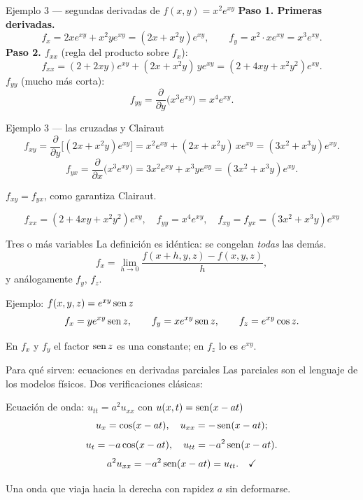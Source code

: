 \documentclass[11pt,aspectratio=169]{beamer}
\begin{document}
\begin{frame}{Ejemplo 3 --- segundas derivadas de $f(x,y)=x^2e^{xy}$}
  \textbf{Paso 1. Primeras derivadas.}
  \[
    f_x = 2xe^{xy} + x^2ye^{xy} = (2x+x^2y)e^{xy},
    \qquad
    f_y = x^2\cdot xe^{xy}=x^3e^{xy}.
  \]
  \pause
  \textbf{Paso 2. $f_{xx}$} (regla del producto sobre $f_x$):
  \[
    f_{xx}=(2+2xy)e^{xy}+(2x+x^2y)\,ye^{xy}=(2+4xy+x^2y^2)e^{xy}.
  \]
  \pause
  \textbf{$f_{yy}$} (mucho más corta):
  \[
    f_{yy}=\frac{\partial}{\partial y}\bigl(x^3e^{xy}\bigr)=x^4e^{xy}.
  \]
\end{frame}

\begin{frame}{Ejemplo 3 --- las cruzadas y Clairaut}
  \[
    f_{xy}=\frac{\partial}{\partial y}\bigl[(2x+x^2y)e^{xy}\bigr]
          = x^2e^{xy}+(2x+x^2y)\,xe^{xy}
          = (3x^2+x^3y)e^{xy}.
  \]
  \pause
  \[
    f_{yx}=\frac{\partial}{\partial x}\bigl(x^3e^{xy}\bigr)
          = 3x^2e^{xy}+x^3ye^{xy}
          = (3x^2+x^3y)e^{xy}.
  \]
  \pause
  \begin{center}\normalsize\color{tealx} $f_{xy}=f_{yx}$, como garantiza Clairaut.\end{center}
  \pause
  \[
    \boxed{f_{xx}=(2+4xy+x^2y^2)e^{xy},\quad f_{yy}=x^4e^{xy},\quad f_{xy}=f_{yx}=(3x^2+x^3y)e^{xy}}
  \]
\end{frame}

\begin{frame}{Tres o más variables}
  La definición es idéntica: se congelan \emph{todas} las demás.
  \[
    f_x=\lim_{h\to 0}\frac{f(x+h,y,z)-f(x,y,z)}{h},
  \]
  y análogamente $f_y$, $f_z$.
  \pause
  \vspace{6pt}
  \begin{block}{Ejemplo: $f(x,y,z)=e^{xy}\operatorname{sen} z$}
    \[
      f_x=ye^{xy}\operatorname{sen} z,\qquad
      f_y=xe^{xy}\operatorname{sen} z,\qquad
      f_z=e^{xy}\cos z.
    \]
  \end{block}
  \pause
  \begin{center}\small\color{gray60} En $f_x$ y $f_y$ el factor $\operatorname{sen} z$ es una constante; en $f_z$ lo es $e^{xy}$.\end{center}
\end{frame}

\begin{frame}{Para qué sirven: ecuaciones en derivadas parciales}
  Las parciales son el lenguaje de los modelos físicos. Dos verificaciones clásicas:
  \vspace{6pt}
  \pause
  \begin{block}{Ecuación de onda: $u_{tt}=a^2u_{xx}$ con $u(x,t)=\operatorname{sen}(x-at)$}
    \[
      u_x=\cos(x-at),\quad u_{xx}=-\operatorname{sen}(x-at);
    \]
    \[
      u_t=-a\cos(x-at),\quad u_{tt}=-a^2\operatorname{sen}(x-at).
    \]
    \[
      a^2u_{xx}=-a^2\operatorname{sen}(x-at)=u_{tt}.\quad\checkmark
    \]
  \end{block}
  \pause
  \begin{center}\small\color{gray60} Una onda que viaja hacia la derecha con rapidez $a$ sin deformarse.\end{center}
\end{frame}
\end{document}
